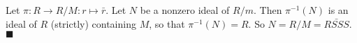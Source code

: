 Let $\pi : R \to R/M : r \mapsto \bar{r}$. Let $N$ be a nonzero ideal of $R/m$. Then $\pi^{-1}(N)$ is an ideal of $R$ (strictly) containing $M$, so that $\pi^{-1}(N)=R$. So $N= R/M = \bar{RSSS}$. 
 $\blacksquare$